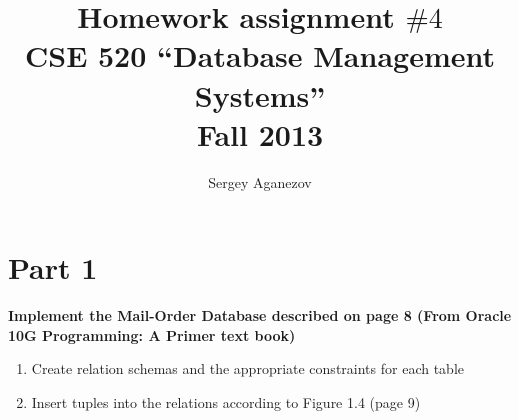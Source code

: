 \documentclass{article}
\author{Sergey Aganezov}
\title{Homework assignment $\#4$ \\ CSE 520 ``Database Management Systems'' \\ Fall 2013}
\date{}
\newenvironment{problem}[1][\unskip]%
{\centering\textbf{ #1}%
\vspace{0.5cm}
\begin{em}}%
{\end{em}}
\begin{document}
	\maketitle
	\newpage
	\section{Part 1}
	\begin{problem}[Implement the Mail-Order Database described on page 8 (From Oracle 10G Programming: A Primer text book)]
		\begin{enumerate}
			\item  Create relation schemas and the appropriate constraints for each table
			\item  Insert tuples into the relations according to Figure 1.4 (page 9)
		\end{enumerate}
	\end{problem}
\end{document}
